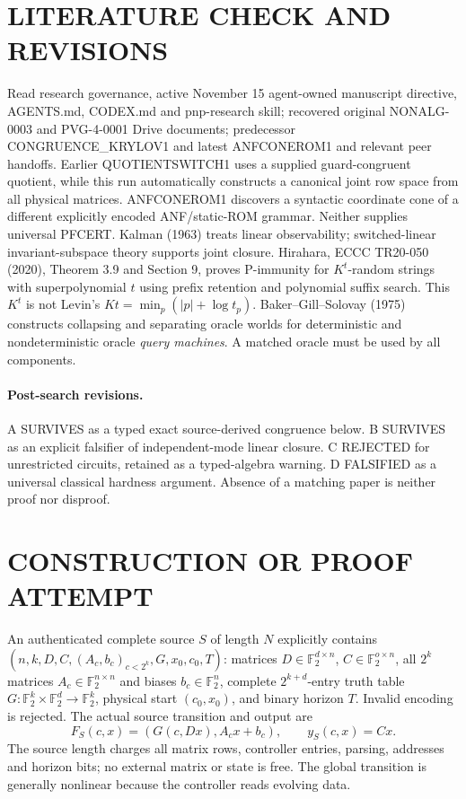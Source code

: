 \documentclass[11pt]{article}
\newcommand{\F}{\mathbb F_2}
\begin{document}
\section{LITERATURE CHECK AND REVISIONS}
Read research governance, active November 15 agent-owned manuscript directive, AGENTS.md, CODEX.md and pnp-research skill; recovered original NONALG-0003 and PVG-4-0001 Drive documents; predecessor CONGRUENCE\_KRYLOV1 and latest ANFCONEROM1 and relevant peer handoffs. Earlier QUOTIENTSWITCH1 uses a supplied guard-congruent quotient, while this run automatically constructs a canonical joint row space from all physical matrices. ANFCONEROM1 discovers a syntactic coordinate cone of a different explicitly encoded ANF/static-ROM grammar. Neither supplies universal PFCERT.
Kalman (1963) treats linear observability; switched-linear invariant-subspace theory supports joint closure. Hirahara, ECCC TR20-050 (2020), Theorem 3.9 and Section 9, proves P-immunity for $K^t$-random strings with superpolynomial $t$ using prefix retention and polynomial suffix search. This $K^t$ is not Levin's $Kt=\min_p(|p|+\log t_p)$. Baker--Gill--Solovay (1975) constructs collapsing and separating oracle worlds for deterministic and nondeterministic oracle \emph{query machines}. A matched oracle must be used by all components.
\paragraph{Post-search revisions.} A SURVIVES as a typed exact source-derived congruence below. B SURVIVES as an explicit falsifier of independent-mode linear closure. C REJECTED for unrestricted circuits, retained as a typed-algebra warning. D FALSIFIED as a universal classical hardness argument. Absence of a matching paper is neither proof nor disproof.

\section{CONSTRUCTION OR PROOF ATTEMPT}
An authenticated complete source $S$ of length $N$ explicitly contains $(n,k,D,C,(A_c,b_c)_{c<2^k},G,x_0,c_0,T)$: matrices $D\in\F^{d\times n}$, $C\in\F^{o\times n}$, all $2^k$ matrices $A_c\in\F^{n\times n}$ and biases $b_c\in\F^n$, complete $2^{k+d}$-entry truth table $G:\F^k\times\F^d\to\F^k$, physical start $(c_0,x_0)$, and binary horizon $T$. Invalid encoding is rejected. The actual source transition and output are
\[
 F_S(c,x)=(G(c,Dx),A_cx+b_c),\qquad y_S(c,x)=Cx.
\]
The source length charges all matrix rows, controller entries, parsing, addresses and horizon bits; no external matrix or state is free. The global transition is generally nonlinear because the controller reads evolving data.
\end{document}
